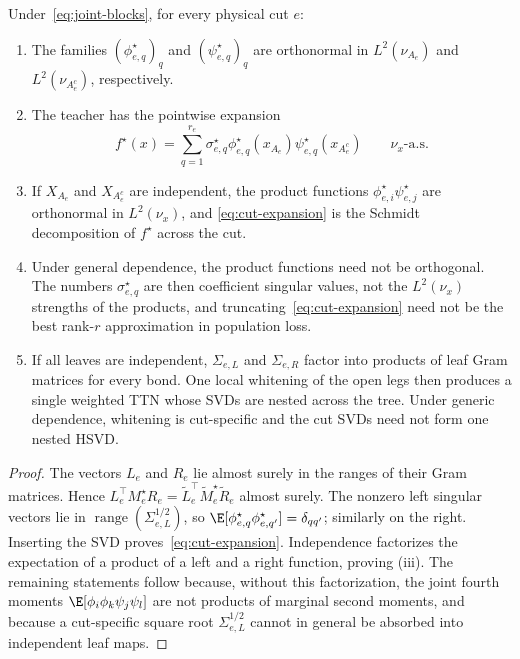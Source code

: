 \begin{proposition}\label{prop:dw-hsvd}
Under~\eqref{eq:joint-blocks}, for every physical cut $e$:
\begin{enumerate}[label=(\roman*),nosep]
\item The families $(\phi_{e,q}^\star)_q$ and $(\psi_{e,q}^\star)_q$ are orthonormal in
      $L^2(\nu_{A_e})$ and $L^2(\nu_{A_e^c})$, respectively.
\item The teacher has the pointwise expansion
\begin{equation}\label{eq:cut-expansion}
 f^\star(x)=\sum_{q=1}^{r_e}\sigma_{e,q}^\star
 \phi_{e,q}^\star(x_{A_e})\psi_{e,q}^\star(x_{A_e^c})
 \qquad \nu_x\text{-a.s.}
\end{equation}
\item If $X_{A_e}$ and $X_{A_e^c}$ are independent, the product functions
      $\phi_{e,i}^\star\psi_{e,j}^\star$ are orthonormal in $L^2(\nu_x)$, and
      \eqref{eq:cut-expansion} is the Schmidt decomposition of $f^\star$ across the cut.
\item Under general dependence, the product functions need not be orthogonal.  The numbers
      $\sigma_{e,q}^\star$ are then coefficient singular values, not the $L^2(\nu_x)$ strengths of
      the products, and truncating~\eqref{eq:cut-expansion} need not be the best rank-$r$
      approximation in population loss.
\item If all leaves are independent, $\Sigma_{e,L}$ and $\Sigma_{e,R}$ factor into products of
      leaf Gram matrices for every bond.  One local whitening of the open legs then produces a
      single weighted TTN whose SVDs are nested across the tree.  Under generic dependence,
      whitening is cut-specific and the cut SVDs need not form one nested HSVD.
\end{enumerate}
\end{proposition}

\begin{proof}
The vectors $L_e$ and $R_e$ lie almost surely in the ranges of their Gram matrices.  Hence
$L_e^\top M_e^\star R_e=\widetilde L_e^\top\widetilde M_e^\star\widetilde R_e$ almost surely.
The nonzero left singular vectors lie in $\operatorname{range}(\Sigma_{e,L}^{1/2})$, so
$\E[\phi_{e,q}^\star\phi_{e,q'}^\star]=\delta_{qq'}$; similarly on the right.  Inserting the SVD
proves~\eqref{eq:cut-expansion}.  Independence factorizes the expectation of a product of a left
and a right function, proving (iii).  The remaining statements follow because, without this
factorization, the joint fourth moments
$\E[\phi_i\phi_k\psi_j\psi_l]$ are not products of marginal second moments, and because a
cut-specific square root $\Sigma_{e,L}^{1/2}$ cannot in general be absorbed into independent leaf
maps.
\end{proof}


